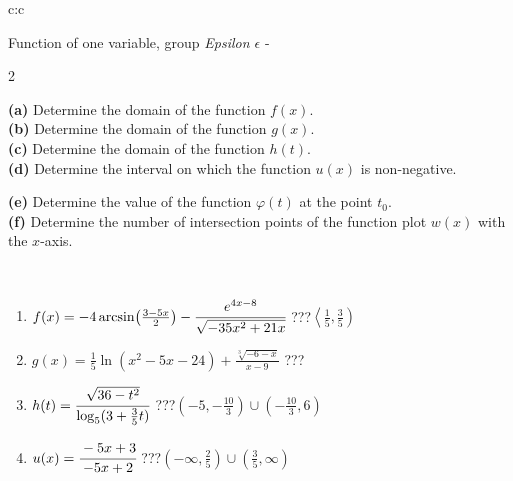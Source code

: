 \documentclass[10pt]{report}
\begin{document}
\begin{tabular}{c:c}
\begin{minipage}[c][104.5mm][t]{0.5\linewidth}
\begin{center}
\vspace{7mm}
{\huge Function of one variable, group \textit{Epsilon $\epsilon$} -}\\[5mm]
\begin{minipage}{0.95\linewidth}
\begin{center}
{\small \begin{multicols}{2} \raggedright
\textbf{(a)} Determine the domain of the function \(f(x)\). \\[1mm]
\textbf{(b)} Determine the domain of the function \(g(x)\). \\[1mm]
\textbf{(c)} Determine the domain of the function \(h(t)\). \\[1mm]
\textbf{(d)} Determine the interval on which the function \(u(x)\) is non-negative. \par \columnbreak
\textbf{(e)} Determine the value of the function \(\varphi(t)\) at the point \(t_0\). \\[1mm]
\textbf{(f)} Determine the number of intersection points of the function plot \(w(x)\) with the \(x\)-axis. \\[1mm]
\end{multicols}
}
\end{center}
\end{minipage}
\\[4mm]
\begin{minipage}{0.79\linewidth}
\begin{center}
\begin{varwidth}{\linewidth}
\begin{enumerate}
\small
\item $f(x) = -4\arcsin\!\left( \frac{3-5x}{2} \right) - \cfrac{e^{4x-8}}{\sqrt{-35x^2+21x}}$\quad \dotfill\; ???\;\dotfill \quad $\left\langle\frac{1}{5} , \frac{3}{5}\right)$
\item $g(x) = \frac{1}{5} \ln{\!(x^2-5x-24)}+\frac{\sqrt[3]{-6-x}}{x-9}$\quad \dotfill\; ???\;\dotfill {}
\item $h(t) = \cfrac{\sqrt{36-t^2}}{\log_5(3+\frac{3}{5}t)}$\quad \dotfill\; ???\;\dotfill \quad $\left(-5 , -\frac{10}{3}\right)\cup\left(-\frac{10}{3} , 6\right)$
\item $u(x) = \cfrac{-5x+3}{-5x+2}$\quad \dotfill\; ???\;\dotfill \quad $\left(-\infty , \frac{2}{5}\right)\cup\left(\frac{3}{5} , \infty\right)$

\end{enumerate}
\end{varwidth}
\end{center}
\end{minipage}
\end{center}
\end{minipage}
\end{tabular}
\end{document}
